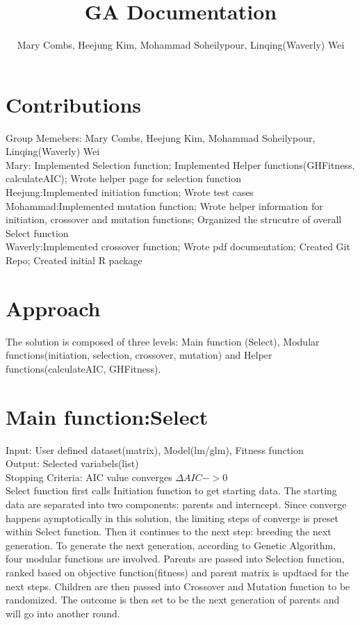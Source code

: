 \documentclass{article}\usepackage[]{graphicx}\usepackage[]{color}
\begin{document}
\title{GA Documentation}
\author{Mary Combs, Heejung Kim, Mohammad Soheilypour, Linqing(Waverly) Wei}
\maketitle
\section{Contributions}
Group Memebers: Mary Combs, Heejung Kim, Mohammad Soheilypour, Linqing(Waverly) Wei\\

Mary: Implemented Selection function; Implemented Helper functions(GHFitness, calculateAIC); Wrote helper page for selection function\\

Heejung:Implemented initiation function; Wrote test cases\\

Mohammad:Implemented mutation function; Wrote helper information for initiation, crossover and mutation functions; Organized the strucutre of overall Select function\\

Waverly:Implemented crossover function; Wrote pdf documentation; Created Git Repo; Created initial R package
\section{Approach}
The solution is composed of three levels: Main function (Select), Modular functions(initiation, selection, crossover, mutation) and Helper functions(calculateAIC, GHFitness). \\
\section{Main function:Select}
Input: User defined dataset(matrix), Model(lm/glm), Fitness function\\
Output: Selected variabels(list)\\
Stopping Criteria: AIC value converges \(\Delta AIC -> 0\)\\

Select function first calls Initiation function to get starting data. The starting data are separated into two components: parents and interncept. Since converge happens aymptotically in this solution, the limiting steps of converge is preset within Select function. Then it continues to the next step: breeding the next generation. To generate the next generation, according to Genetic Algorithm, four modular functions are involved. Parents are passed into Selection function, ranked based on objective function(fitness) and parent matrix is updtaed for the next steps. Children are then passed into Crossover and Mutation function to be randomized. The outcome is then set to be the next generation of parents and will go into another round.
\end{document}
